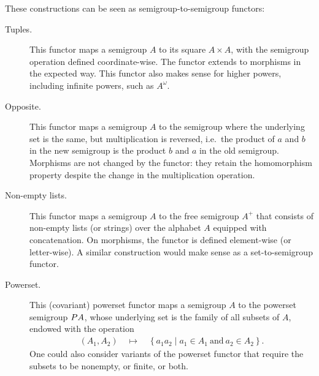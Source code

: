  \begin{example}\label{ex:functors}
 These constructions can be seen as semigroup-to-semigroup functors:
 \begin{description}
 \item[Tuples.] This functor maps a semigroup $A$ to its square $A \times A$, with the semigroup operation defined coordinate-wise. The functor extends to morphisms in the expected way. This functor also makes sense for higher powers, including infinite powers, such as $A^\omega$.
 \item[Opposite.] This functor maps a semigroup $A$ to the semigroup where the underlying set is the same, but multiplication is reversed, i.e.~the product of $a$ and $b$ in the new semigroup is the product $b$ and $a$ in the old semigroup. Morphisms are not changed by the functor: they retain the homomorphism property despite the change in the multiplication operation.
 \item[Non-empty lists.] This functor maps a semigroup $A$ to the free semigroup $A^+$ that consists of non-empty lists (or strings) over the alphabet $A$ equipped with concatenation. On morphisms, the functor is defined element-wise (or letter-wise). A similar construction would make sense as a set-to-semigroup functor.
 \item[Powerset.] This (covariant) powerset functor maps a semigroup $A$ to the powerset semigroup $\powerset A$, whose underlying set is the family of all subsets of $A$, endowed with the operation
 \begin{align*}
 (A_1,A_2) \quad \mapsto \quad \left\{a_1 a_2 \mid a_1 \in A_1\ \text{and}\ a_2 \in A_2\right\}.
 \end{align*}
 One could also consider variants of the powerset functor that require the subsets to be nonempty, or finite, or both.
 \end{description}
 \end{example}

